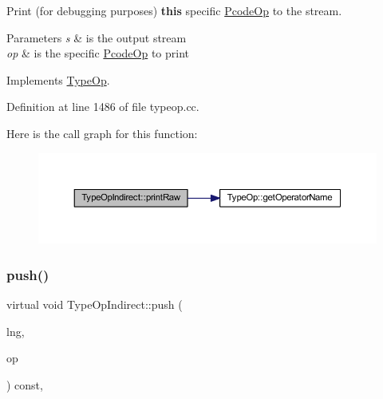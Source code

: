 Print (for debugging purposes) {\bfseries{this}} specific \mbox{\hyperlink{class_pcode_op}{Pcode\+Op}} to the stream. 


\begin{DoxyParams}{Parameters}
{\em s} & is the output stream \\
\hline
{\em op} & is the specific \mbox{\hyperlink{class_pcode_op}{Pcode\+Op}} to print \\
\hline
\end{DoxyParams}


Implements \mbox{\hyperlink{class_type_op_a60717e486917a30cc7cb6e3ce02585e1}{Type\+Op}}.



Definition at line 1486 of file typeop.\+cc.

Here is the call graph for this function\+:
\nopagebreak
\begin{figure}[H]
\begin{center}
\leavevmode
\includegraphics[width=350pt]{class_type_op_indirect_a26e28dde9299bf0eb6ba5277ea7000c0_cgraph}
\end{center}
\end{figure}
\mbox{\label{class_type_op_indirect_a6c1d09459f194501368fd07d9fccc124}} 
\subsubsection{\texorpdfstring{push()}{push()}}
{\footnotesize\ttfamily virtual void Type\+Op\+Indirect\+::push (\begin{DoxyParamCaption}\item[{\mbox{\hyperlink{class_print_language}{Print\+Language}} $\ast$}]{lng,  }\item[{const \mbox{\hyperlink{class_pcode_op}{Pcode\+Op}} $\ast$}]{op }\end{DoxyParamCaption}) const\hspace{0.3cm}{\ttfamily [inline]}, {\ttfamily [virtual]}}



